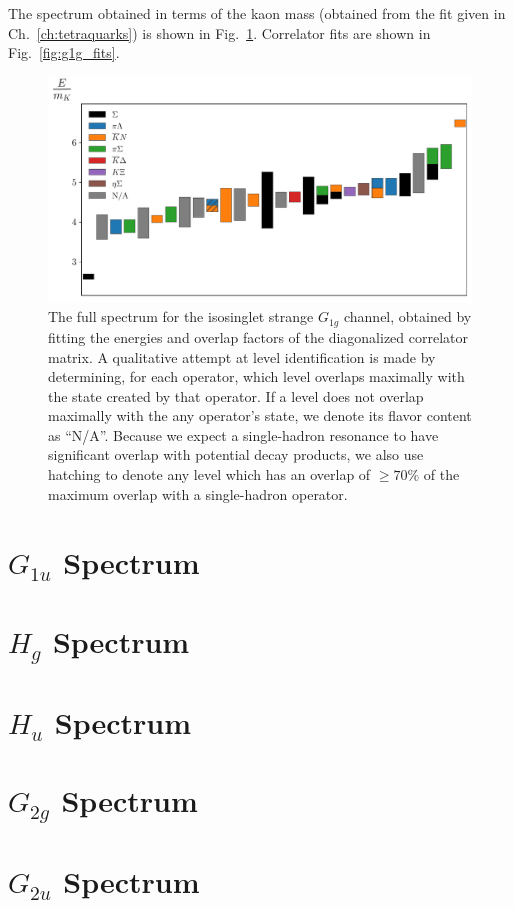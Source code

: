 The spectrum obtained in terms of the kaon mass (obtained from the fit given in Ch.~\ref{ch:tetraquarks}) is shown in Fig.~\ref{fig:g1g_spectrum}. Correlator fits are shown in Fig.~\ref{fig:g1g_fits}.

\begin{figure}
    \centering
    \hspace*{-0.5in}\includegraphics[width=\textwidth]{figures/sigmas/g1g/staircase_mk.pdf}
    \caption{The full spectrum for the isosinglet strange $G_{1g}$ channel, obtained by fitting the energies and overlap factors of the diagonalized correlator matrix. A qualitative attempt at level identification is made by determining, for each operator, which level overlaps maximally with the state created by that operator. If a level does not overlap maximally with the any operator's state, we denote its flavor content as ``N/A''. Because we expect a single-hadron resonance to have significant overlap with potential decay products, we also use hatching to denote any level which has an overlap of $\geq 70\%$ of the maximum overlap with a single-hadron operator.}\label{fig:g1g_spectrum}
\end{figure}

\section{$G_{1u}$ Spectrum}
\section{$H_g$ Spectrum}
\section{$H_u$ Spectrum}
\section{$G_{2g}$ Spectrum}
\section{$G_{2u}$ Spectrum}